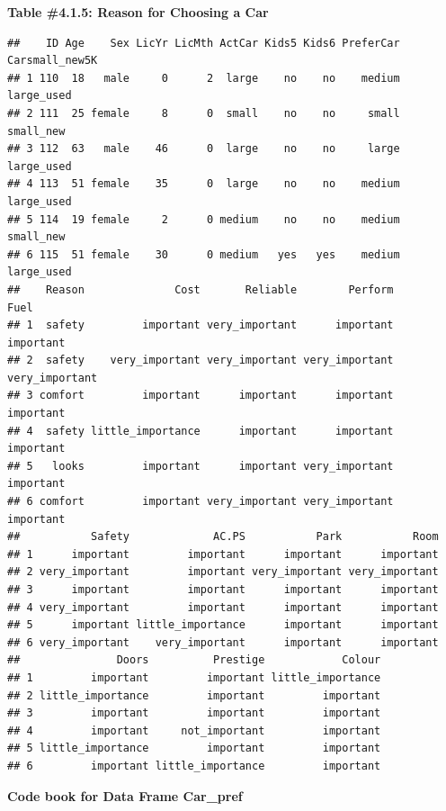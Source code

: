 \documentclass[]{book}
\begin{document}
\textbf{Table \#4.1.5: Reason for Choosing a Car}

\begin{verbatim}
##    ID Age    Sex LicYr LicMth ActCar Kids5 Kids6 PreferCar Carsmall_new5K
## 1 110  18   male     0      2  large    no    no    medium     large_used
## 2 111  25 female     8      0  small    no    no     small      small_new
## 3 112  63   male    46      0  large    no    no     large     large_used
## 4 113  51 female    35      0  large    no    no    medium     large_used
## 5 114  19 female     2      0 medium    no    no    medium      small_new
## 6 115  51 female    30      0 medium   yes   yes    medium     large_used
##    Reason              Cost       Reliable        Perform           Fuel
## 1  safety         important very_important      important      important
## 2  safety    very_important very_important very_important very_important
## 3 comfort         important      important      important      important
## 4  safety little_importance      important      important      important
## 5   looks         important      important very_important      important
## 6 comfort         important very_important very_important      important
##           Safety             AC.PS           Park           Room
## 1      important         important      important      important
## 2 very_important         important very_important very_important
## 3      important         important      important      important
## 4 very_important         important      important      important
## 5      important little_importance      important      important
## 6 very_important    very_important      important      important
##               Doors          Prestige            Colour
## 1         important         important little_importance
## 2 little_importance         important         important
## 3         important         important         important
## 4         important     not_important         important
## 5 little_importance         important         important
## 6         important little_importance         important
\end{verbatim}

\textbf{Code book for Data Frame Car\_pref}
\end{document}
